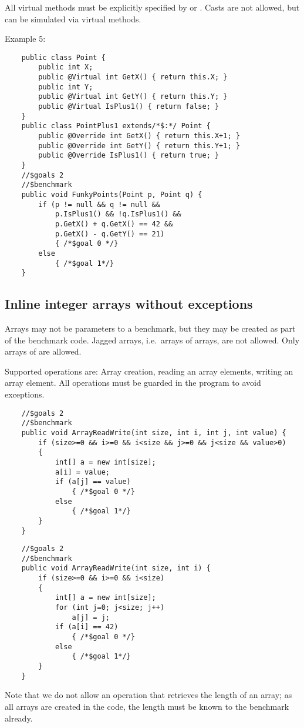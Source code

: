 All virtual methods must be explicitly specified by  or .
Casts are not allowed, but can be simulated via virtual methods.

Example 5:
\begin{verbatim}
    public class Point {
        public int X;
        public @Virtual int GetX() { return this.X; }
        public int Y;
        public @Virtual int GetY() { return this.Y; }
        public @Virtual IsPlus1() { return false; }
    }
    public class PointPlus1 extends/*$:*/ Point {
        public @Override int GetX() { return this.X+1; }
        public @Override int GetY() { return this.Y+1; }
        public @Override IsPlus1() { return true; }
    }
    //$goals 2
    //$benchmark
    public void FunkyPoints(Point p, Point q) {
        if (p != null && q != null &&
            p.IsPlus1() && !q.IsPlus1() &&
            p.GetX() + q.GetX() == 42 &&
            p.GetX() - q.GetY() == 21)
            { /*$goal 0 */}
        else
            { /*$goal 1*/}
    }
\end{verbatim}

\subsection{Inline integer arrays without exceptions}

Arrays may not be parameters to a benchmark,
but they may be created as part of the benchmark code.
Jagged arrays, i.e.\ arrays of arrays, are not allowed.
Only arrays of  are allowed.

Supported operations are: Array creation, reading an array elements, writing an array element.
All operations must be guarded in the program to avoid exceptions.

\begin{verbatim}
    //$goals 2
    //$benchmark
    public void ArrayReadWrite(int size, int i, int j, int value) {
        if (size>=0 && i>=0 && i<size && j>=0 && j<size && value>0)
        {
            int[] a = new int[size];
            a[i] = value;
            if (a[j] == value)
                { /*$goal 0 */}
            else
                { /*$goal 1*/}
        }
    }
\end{verbatim}

\begin{verbatim}
    //$goals 2
    //$benchmark
    public void ArrayReadWrite(int size, int i) {
        if (size>=0 && i>=0 && i<size)
        {
            int[] a = new int[size];
            for (int j=0; j<size; j++)
                a[j] = j;
            if (a[i] == 42)
                { /*$goal 0 */}
            else
                { /*$goal 1*/}
        }
    }
\end{verbatim}

Note that we do not allow an operation that retrieves the length of an array;
as all arrays are created in the code, the length must be known to the benchmark already.